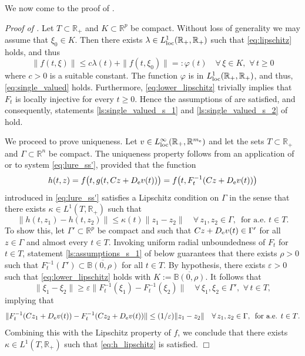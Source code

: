 \documentclass[a4paper,11pt]{article}
\newcommand{\B}{\mathbb B}
\newcommand{\R}{\mathbb R}
\numberwithin{equation}{section}
\numberwithin{figure}{section}
\numberwithin{table}{section}
\begin{document}
We now come to the proof of .

{\it Proof of .}
Let $T\subset\R_+$ and $K\subset\R^p$ be compact. Without loss of generality we may assume that
$\xi_0\in K$. Then there exists $\lambda\in L^1_{\rm loc}(\R_+,\R_+)$ such that \eqref{eq:lipschitz} holds, and thus
\[
\|f(t,\xi)\|\leq c\lambda(t)+\|f(t,\xi_0)\|=:\varphi(t)\quad\forall\,\xi\in K,\,\,\forall\,t\geq 0
\]
where $c>0$ is a suitable constant. The function $\varphi$ is in $L^1_{\rm loc}(\R_+,\R_+)$,
and thus, \eqref{eq:single_valued} holds. Furthermore, \eqref{eq:lower_lipschitz} trivially implies that $F_t$ is locally injective for every $t\geq 0$. Hence the assumptions of  are satisfied, and consequently, statements \ref{ls:single_valued_s_1} and \ref{ls:single_valued_s_2} of  hold.

We proceed to prove uniqueness. Let $v\in L^\infty_{\rm loc}(\R_+,\R^{m_{\rm e}})$ and let
the sets $T\subset\R_+$ and $\Gamma\subset\R^n$ be compact.
The uniqueness property follows from an application of \cite[Appendix C.3]{s98} or \cite[Chapter III, \S 10, Supp.\,II]{w98} to system \eqref{eq:lure_ss'}, provided that the function
\[
h(t,z)=f\big(t,g(t,Cz+D_{\rm e}v(t))\big)=f\big(t,F_t^{-1}(Cz+D_{\rm e}v(t))\big)
\]
introduced in \eqref{eq:lure_ss'} satisfies a Lipschitz condition on $\Gamma$ in the sense that there exists $\kappa\in L^1(T,\R_+)$ such that
\begin{equation}\label{eq:h_lipschitz}
\|h(t,z_1)-h(t,z_2)\|\leq\kappa(t)\|z_1-z_2\|\quad\forall\,z_1,z_2\in\Gamma,\,\,\,
\mbox{for a.e. $t\in T$}.
\end{equation}
To show this, let $\Gamma'\subset\R^p$ be compact and such that $Cz+D_{\rm e}v(t)\in\Gamma'$ for all $z\in\Gamma$ and almost every $t\in T$. Invoking uniform radial unboundedness of $F_t$ for $t\in T$, statement \ref{ls:assumptions_s_1} of  below guarantees that there exists $\rho>0$ such that $F_t^{-1}(\Gamma')\subset\overline{\B(0,\rho)}$ for all $t\in T$. By hypothesis, there exists $\varepsilon>0$ such that \eqref{eq:lower_lipschitz} holds with $K:=\overline{\B(0,\rho)}$. It follows that
\[
\|\xi_1-\xi_2\|\geq\varepsilon\|F_t^{-1}(\xi_1)-F_t^{-1}(\xi_2)\|\quad\forall\,\xi_1,\xi_2\in\Gamma',\,\,
\forall\,t\in T,
\]
implying that
\[
\|F_t^{-1}(Cz_1+D_{\rm e}v(t))-F_t^{-1}(Cz_2+D_{\rm e}v(t))\|\leq (1/\varepsilon)\|z_1-z_2\|\quad
\forall\,z_1,z_2\in\Gamma,\,\,\,\mbox{for a.e. $t\in T$}.
\]
Combining this with the Lipschitz property of $f$, we conclude that there exists  $\kappa\in L^1(T,\R_+)$ such that \eqref{eq:h_lipschitz} is satisfied.
\hfill$\Box$
\end{document}
